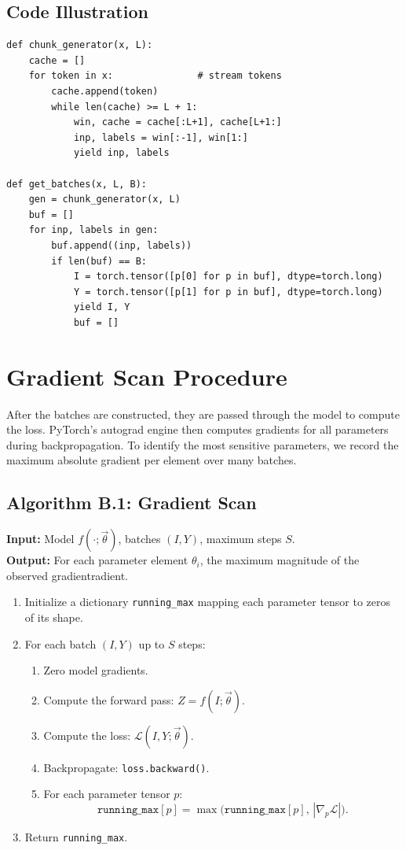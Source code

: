 \documentclass[12pt]{article}
\begin{document}
\subsection*{Code Illustration}
\begin{lstlisting}[style=pycode]
def chunk_generator(x, L):
    cache = []
    for token in x:               # stream tokens
        cache.append(token)
        while len(cache) >= L + 1:
            win, cache = cache[:L+1], cache[L+1:]
            inp, labels = win[:-1], win[1:]
            yield inp, labels

def get_batches(x, L, B):
    gen = chunk_generator(x, L)
    buf = []
    for inp, labels in gen:
        buf.append((inp, labels))
        if len(buf) == B:
            I = torch.tensor([p[0] for p in buf], dtype=torch.long)
            Y = torch.tensor([p[1] for p in buf], dtype=torch.long)
            yield I, Y
            buf = []
\end{lstlisting}

\section{Gradient Scan Procedure}
After the batches are constructed, they are passed through the model to compute the loss. PyTorch’s autograd engine then computes gradients for all parameters during backpropagation. To identify the most sensitive parameters, we record the maximum absolute gradient per element over many batches.

\subsection*{Algorithm B.1: Gradient Scan}
\textbf{Input:} Model $f(\cdot;\vec{\theta})$, batches $(I,Y)$, maximum steps $S$. \\
\textbf{Output:} For each parameter element $\theta_i$, the maximum magnitude of the observed gradientradient.

\begin{enumerate}
  \item Initialize a dictionary \texttt{running\_max} mapping each parameter tensor to zeros of its shape.
  \item For each batch $(I,Y)$ up to $S$ steps:
  \begin{enumerate}
    \item Zero model gradients.
    \item Compute the forward pass: $Z = f(I;\vec{\theta})$.
    \item Compute the loss: $\mathcal{L}(I,Y;\vec{\theta})$.
    \item Backpropagate: \texttt{loss.backward()}.
    \item For each parameter tensor $p$:
    \begin{equation*}
      \texttt{running\_max}[p] = \max\!\big(\texttt{running\_max}[p], \, |\nabla_p \mathcal{L}|\big).
    \end{equation*}
  \end{enumerate}
  \item Return \texttt{running\_max}.
\end{enumerate}
\end{document}
